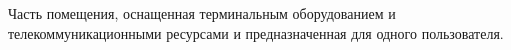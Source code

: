 Часть помещения, оснащенная терминальным оборудованием и 
телекоммуникационными ресурсами и предназначенная для 
одного пользователя.